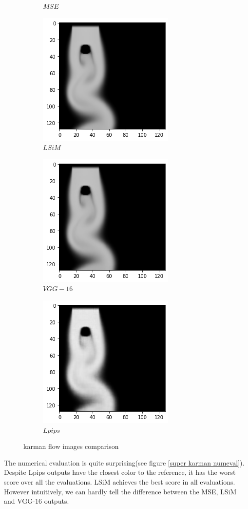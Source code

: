 \documentclass[a4paper,12pt,twoside]{report}
\begin{document}
\begin{figure}
\begin{subfigure}{0.32\textwidth}
		\caption{$MSE$}
	\end{subfigure}
	\begin{subfigure}{0.32\textwidth}
		\centering
		\includegraphics[scale=0.5]{superresolution/karman_lsim.png}
		\caption{$LSiM$}
	\end{subfigure}
	\begin{subfigure}{0.32\textwidth}
		\centering
		\includegraphics[scale=0.5]{superresolution/karman_vgg.png}
		\caption{$VGG-16$}
	\end{subfigure}
	\begin{subfigure}{0.32\textwidth}
		\centering
		\includegraphics[scale=0.5]{superresolution/karman_lpips.png}
		\caption{$Lpips$}
	\end{subfigure}
	\caption{karman flow images comparison}
	\label{super karman}
\end{figure}
The numerical evaluation is quite surprising(see figure \ref{super karman numeval}). Despite Lpips outputs have the closest color to the reference, it has the worst score over all the evaluations. LSiM achieves the best score in all evaluations. However intuitively, we can hardly tell the difference between the MSE, LSiM and VGG-16 outputs.
 
\end{document}

